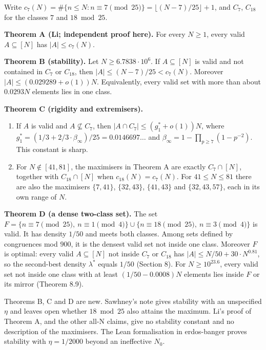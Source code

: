 \documentclass[
  11pt,
]{article}
\providecommand{\tightlist}{%
  \setlength{\itemsep}{0pt}\setlength{\parskip}{0pt}}
\begin{document}
Write
\(c_7(N) = \#\{n \le N : n \equiv 7 \pmod{25}\} = \lfloor (N - 7)/25\rfloor + 1\),
and \(C_7\), \(C_{18}\) for the classes \(7\) and \(18 \bmod 25\).

\textbf{Theorem A (Li; independent proof here).} For every \(N \ge 1\),
every valid \(A \subseteq [N]\) has \(|A| \le c_7(N)\).

\textbf{Theorem B (stability).} Let \(N \ge 6.7838\cdot 10^{6}\). If
\(A \subseteq [N]\) is valid and not contained in \(C_7\) or \(C_{18}\),
then \(|A| \le (N - 7)/25 < c_7(N)\). Moreover
\(|A| \le (0.029289 + o(1))N\). Equivalently, every valid set with more
than about \(0.0293N\) elements lies in one class.

\textbf{Theorem C (rigidity and extremisers).}

\begin{enumerate}
\def\labelenumi{\arabic{enumi}.}
\tightlist
\item
  If \(A\) is valid and \(A \not\subseteq C_7\), then
  \(|A \cap C_7| \le (g_1^* + o(1))N\), where
  \(g_1^* = (1/3 + 2/3\cdot \beta_\infty)/25 = 0.0146697\dots\) and
  \(\beta_\infty = 1 - \prod_{p\ge 7}(1 - p^{-2})\). This constant is
  sharp.
\item
  For \(N \notin [41, 81]\), the maximisers in Theorem A are exactly
  \(C_7 \cap [N]\), together with \(C_{18} \cap [N]\) when
  \(c_{18}(N) = c_7(N)\). For \(41 \le N \le 81\) there are also the
  maximisers \(\{7, 41\}\), \(\{32, 43\}\), \(\{41, 43\}\) and
  \(\{32, 43, 57\}\), each in its own range of \(N\).
\end{enumerate}

\textbf{Theorem D (a dense two-class set).} The set
\(F = \{n \equiv 7 \pmod{25},\ n \equiv 1 \pmod{4}\} \cup \{n \equiv 18 \pmod{25},\ n \equiv 3 \pmod{4}\}\)
is valid. It has density \(1/50\) and meets both classes. Among sets
defined by congruences mod \(900\), it is the densest valid set not
inside one class. Moreover \(F\) is optimal: every valid
\(A \subseteq [N]\) not inside \(C_7\) or \(C_{18}\) has
\(|A| \le N/50 + 30\cdot N^{0.81}\), so the second-best density
\(\lambda^*\) equals \(1/50\) (Section 8). For \(N \ge 10^{23.6}\),
every valid set not inside one class with at least \((1/50 - 0.0008)N\)
elements lies inside \(F\) or its mirror (Theorem 8.9).

Theorems B, C and D are new. Sawhney's note gives stability with an
unspecified \(\eta\) and leaves open whether \(18 \bmod 25\) also
attains the maximum. Li's proof of Theorem A, and the other all-N
claims, give no stability constant and no description of the maximisers.
The Lean formalisation in erdos-banger proves stability with
\(\eta = 1/2000\) beyond an ineffective \(N_0\).
\end{document}
